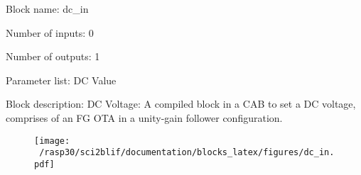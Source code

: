 \pagebreak

Block name: dc\_in

Number of inputs: 0

Number of outputs: 1

Parameter list: DC Value

Block description: 
DC Voltage: A compiled block in a CAB to set a DC voltage, comprises of an FG OTA in a unity-gain follower configuration.

\begin{figure}[H]  %
\texttt{[image: ~/rasp30/sci2blif/documentation/blocks\_latex/figures/dc\_in.pdf]}
\end{figure}

